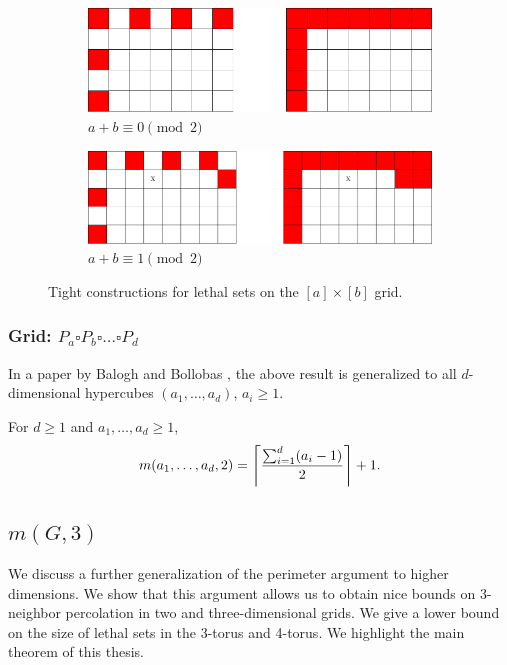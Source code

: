 \begin{figure}[]
\centering
\begin{subfigure}{0.4\textwidth}
	\includegraphics[width=\textwidth]{figures/1/5x7x1.pdf}
	\caption{$a+b \equiv 0 \pmod 2$}
	\label{fig:sa_construction_2d_a}
\end{subfigure} \hfill%
\begin{subfigure}{0.45\textwidth}
	\includegraphics[width=\textwidth]{figures/1/5x8x1.pdf}
	\caption{$a+b \equiv 1 \pmod 2$}
	\label{fig:sa_construction_2d_b}
\end{subfigure}
\caption{Tight constructions for lethal sets on the $[a] \times [b]$ grid.}
\label{fig:sa_construction_2d}
\end{figure} 

\subsubsection{Grid: $P_a \square P_b \square \dots \square P_d$}

In a paper by Balogh and Bollobas \cite{balogh:2006}, the above result is generalized to all $d$-dimensional hypercubes $(a_1, \dots, a_d)$, $a_i \geq 1$. 

\begin{thm}
For $d \geq 1$ and $a_1, \dots, a_d \geq 1$, 
$$m(a_1, \dots, a_d, 2) = \ceil*{\frac{\sum_{i=1}^d (a_i-1)}{2}}+1.$$
\end{thm}

\subsection{$m(G,3)$} 

We discuss a further generalization of the perimeter argument to higher dimensions. We show that this argument allows us to obtain nice bounds on 3-neighbor percolation in two and three-dimensional grids. We give a lower bound on the size of lethal sets in the 3-torus and 4-torus. We highlight the main theorem of this thesis.

